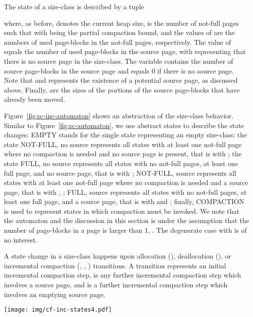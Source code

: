 \documentclass{amsart}
\begin{document}
The state of a size-class is described by a tuple

where, as before,  denotes the current heap size,  is the number
of not-full pages such that  with  being the
partial compaction bound, and the values of  are
the numbers of used page-blocks in the not-full pages, respectively.
The value of  equals the number of used page-blocks in the source
page, with  representing that there is no source page in the
size-class.  The variable  contains the number of source
page-blocks in the source page and equals 0 if there is no source
page. Note that  and  represents the existence of a
potential source page, as discussed above. Finally, 
are the sizes of the portions of the  source page-blocks that have
already been moved.

Figure~\ref{fig:sc-inc-automaton} shows an abstraction of the
size-class behavior.  Similar to Figure~\ref{fig:sc-automaton}, we use
abstract states to describe the state changes:
{\scriptsize{\textsf{EMPTY}}} stands for the single state  representing an empty size-class; the state
{\scriptsize{\textsf{NOT-FULL, no source}}} represents all states with
at least one not-full page where no compaction is needed and no source
page is present, that is 
with ; the state {\scriptsize{\textsf{FULL, no
      source}}} represents all states with no not-full pages, at least
one full page, and no source page, that is 
with ; {\scriptsize{\textsf{NOT-FULL, source}}} represents all
states with at least one not-full page where no compaction is needed
and a source page, that is  with , ;
{\scriptsize{\textsf{FULL, source}}} represents all states with no
not-full pages, at least one full page, and a source page, that is
 with  and ; finally, {\scriptsize{\textsf{COMPACTION}}} is used to represent
states  in which compaction must be invoked.  We note that
the automaton and the discussion in this section is under the
assumption that the number of page-blocks in a page is larger than 1,
. The degenerate case with  is of no interest.

A state change in a size-class happens upon allocation (),
deallocation (), or incremental compaction (, ,
) transitions.  A transition  represents an initial
incremental compaction step,  is any further incremental
compaction step which involves a source page, and  is a further
incremental compaction step which involves an emptying source page.

\begin{figure*}
    \begin{center}
        \texttt{[image: img/cf-inc-states4.pdf]}
        \caption{Incremental size-class automaton with }
            \label{fig:sc-inc-automaton}
    \end{center}
\end{figure*}
\end{document}
